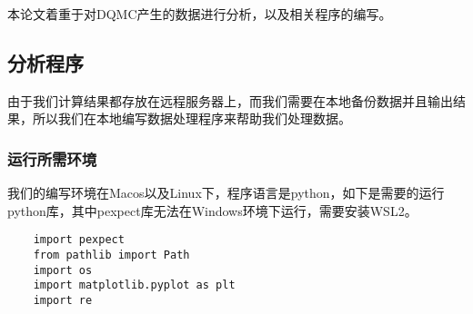 本论文着重于对DQMC产生的数据进行分析，以及相关程序的编写。
\subsection{分析程序}
由于我们计算结果都存放在远程服务器上，而我们需要在本地备份数据并且输出结果，所以我们在本地编写数据处理程序来帮助我们处理数据。
\subsubsection{运行所需环境}
我们的编写环境在Macos以及Linux下，程序语言是python，如下是需要的运行python库，其中pexpect库无法在Windows环境下运行，需要安装WSL2。
\begin{lstlisting}
    import pexpect
    from pathlib import Path
    import os
    import matplotlib.pyplot as plt
    import re
\end{lstlisting}

